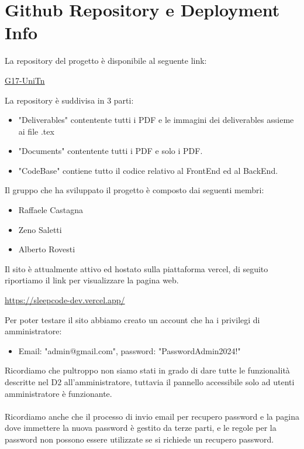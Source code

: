\documentclass[11pt, a4paper]{article}
\theoremstyle{definition}
\begin{document}
\newpage
\section{Github Repository e Deployment Info}
La repository del progetto è disponibile al seguente link:
\begin{center}
  \href{https://github.com/G17-UniTn}{G17-UniTn}
\end{center}
La repository è suddivisa in 3 parti:
\begin{itemize}
  \item "Deliverables" contentente tutti i PDF e le immagini dei deliverables assieme ai file .tex
  \item "Documents" contentente tutti i PDF e solo i PDF.
  \item "CodeBase" contiene tutto il codice relativo al FrontEnd ed al BackEnd.
\end{itemize}Il gruppo che ha sviluppato il progetto è composto dai seguenti membri:
\begin{itemize}
  \item Raffaele Castagna \href{https://github.com/Raffaele-Castagna}{\faGithub}
  \item Zeno Saletti \href{https://github.com/zenosalty}{\faGithub}
  \item Alberto Rovesti \href{https://github.com/uniBeto}{\faGithub}
\end{itemize}Il sito è attualmente attivo ed hostato sulla piattaforma vercel, di seguito riportiamo il link per visualizzare la pagina web.
\begin{center}
  \url{https://sleepcode-dev.vercel.app/}
\end{center}
Per poter testare il sito abbiamo creato un account che ha i privilegi di amministratore:

\begin{itemize}
  \item Email: "admin@gmail.com", password: "PasswordAdmin2024!"
\end{itemize}
Ricordiamo che pultroppo non siamo stati in grado di dare tutte le funzionalità descritte nel D2 all'amministratore, tuttavia il pannello accessibile solo ad utenti amministratore è funzionante.\\\\
Ricordiamo anche che il processo di invio email per recupero password e la pagina dove immettere la nuova password è gestito da terze parti, e le regole per la password non possono essere utilizzate se si richiede un recupero password.
\newpage
\end{document}
